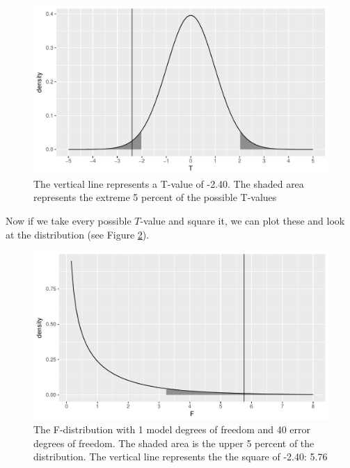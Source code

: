 \documentclass[]{report}\usepackage[]{graphicx}\usepackage[]{color}
\makeatletter
\def\maxwidth{ %
  \ifdim\Gin@nat@width>\linewidth
    \linewidth
  \else
    \Gin@nat@width
  \fi
}
\newenvironment{knitrout}{}{} %
\makeatother
\begin{document}
\begin{knitrout}
\color{fgcolor}\begin{figure}

{\centering \includegraphics[width=\maxwidth]{figure/dummy_23-1} 

}

\caption[The vertical line represents a T-value of -2.40]{The vertical line represents a T-value of -2.40. The shaded area represents the extreme 5 percent of the possible T-values}\label{fig:dummy_23}
\end{figure}


\end{knitrout}

Now if we take every possible $T$-value and square it, we can plot these and look at the distribution (see Figure \ref{fig:dummy_24}).


\begin{knitrout}
\color{fgcolor}\begin{figure}

{\centering \includegraphics[width=\maxwidth]{figure/dummy_24-1} 

}

\caption[The F-distribution with 1 model degrees of freedom and 40 error degrees of freedom]{The F-distribution with 1 model degrees of freedom and 40 error degrees of freedom. The shaded area is the upper 5 percent of the distribution. The vertical line represents the the square of -2.40: 5.76}\label{fig:dummy_24}
\end{figure}


\end{knitrout}
\end{document}

